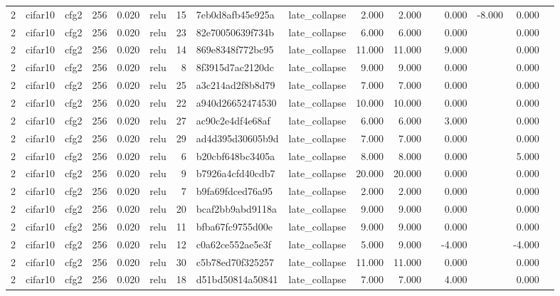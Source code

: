 \begin{table}[htbp]
{\begin{tabular}{@{}rllrrlrllrrrrrrr@{}}
2 & cifar10 & cfg2 & 256 & 0.020 & relu & 15 & 7eb0d8afb45e925a & late\_collapse & 2.000 & 2.000 &  & 0.000 & -8.000 & 0.000 &  \\
2 & cifar10 & cfg2 & 256 & 0.020 & relu & 23 & 82e70050639f734b & late\_collapse & 6.000 & 6.000 &  & 0.000 &  & 0.000 &  \\
2 & cifar10 & cfg2 & 256 & 0.020 & relu & 14 & 869e8348f772bc95 & late\_collapse & 11.000 & 11.000 &  & 9.000 &  & 0.000 &  \\
2 & cifar10 & cfg2 & 256 & 0.020 & relu & 8 & 8f3915d7ac2120dc & late\_collapse & 9.000 & 9.000 &  & 0.000 &  & 0.000 &  \\
2 & cifar10 & cfg2 & 256 & 0.020 & relu & 25 & a3c214ad2f8b8d79 & late\_collapse & 7.000 & 7.000 &  & 0.000 &  & 0.000 &  \\
2 & cifar10 & cfg2 & 256 & 0.020 & relu & 22 & a940d26652474530 & late\_collapse & 10.000 & 10.000 &  & 0.000 &  & 0.000 &  \\
2 & cifar10 & cfg2 & 256 & 0.020 & relu & 27 & ac90c2e4df4e68af & late\_collapse & 6.000 & 6.000 &  & 3.000 &  & 0.000 &  \\
2 & cifar10 & cfg2 & 256 & 0.020 & relu & 29 & ad4d395d30605b9d & late\_collapse & 7.000 & 7.000 &  & 0.000 &  & 0.000 &  \\
2 & cifar10 & cfg2 & 256 & 0.020 & relu & 6 & b20cbf648bc3405a & late\_collapse & 8.000 & 8.000 &  & 0.000 &  & 5.000 &  \\
2 & cifar10 & cfg2 & 256 & 0.020 & relu & 9 & b7926a4cfd40cdb7 & late\_collapse & 20.000 & 20.000 &  & 0.000 &  & 0.000 &  \\
2 & cifar10 & cfg2 & 256 & 0.020 & relu & 7 & b9fa69fdced76a95 & late\_collapse & 2.000 & 2.000 &  & 0.000 &  & 0.000 &  \\
2 & cifar10 & cfg2 & 256 & 0.020 & relu & 20 & bcaf2bb9abd9118a & late\_collapse & 9.000 & 9.000 &  & 0.000 &  & 0.000 &  \\
2 & cifar10 & cfg2 & 256 & 0.020 & relu & 11 & bfba67fc9755d00e & late\_collapse & 9.000 & 9.000 &  & 0.000 &  & 0.000 &  \\
2 & cifar10 & cfg2 & 256 & 0.020 & relu & 12 & c0a62ce552ae5e3f & late\_collapse & 5.000 & 9.000 &  & -4.000 &  & -4.000 &  \\
2 & cifar10 & cfg2 & 256 & 0.020 & relu & 30 & c5b78ed70f325257 & late\_collapse & 11.000 & 11.000 &  & 0.000 &  & 0.000 &  \\
2 & cifar10 & cfg2 & 256 & 0.020 & relu & 18 & d51bd50814a50841 & late\_collapse & 7.000 & 7.000 &  & 4.000 &  & 0.000 &  \\

\end{tabular}}
\end{table}
